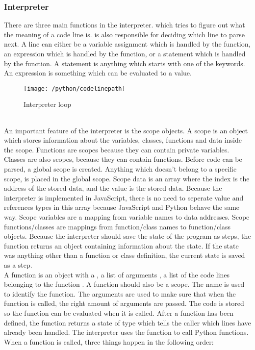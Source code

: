 \subsubsection{Interpreter}
There are three main functions in the interpreter.  which tries to figure out what the meaning of a code line is.  is also responsible for deciding which line to parse next. A line can either be a variable assignment which is handled  by the  function, an expression which is handled by the  function, or a statement which is handled by the  function. A statement is anything which starts with one of the keywords. An expression is something which can be evaluated to a value.
\begin{figure}[h]
    \centering
    \texttt{[image: /python/codelinepath]}
    \caption{Interpreter loop}
    \label{fig:pythonCodeLinePath}
\end{figure}
\\[11pt]
An important feature of the interpreter is the scope objects. A scope is an object which stores information about the variables, classes, functions and data inside the scope. Functions are scopes because they can contain private variables. Classes are also scopes, because they can contain functions. Before code can be parsed, a global scope is created. Anything which doesn't belong to a specific scope, is placed in the global scope. Scope data is an array where the index is the address of the stored data, and the value is the stored data. Because the interpreter is implemented in JavaScript, there is no need to seperate value and references types in this array because JavaScript and Python behave the same way. Scope variables are a mapping from variable names to data addresses. Scope functions/classes are mappings from function/class names to function/class objects. Because the interpreter should save the state of the program as steps, the  function returns an object containing information about the state. If the state was anything other than a function or class definition, the current state is saved as a step.
\\[11pt]
A function is an object with a , a list of arguments , a list of the code lines belonging to the function . A function should also be a scope. The name is used to identify the function. The arguments are used to make sure that when the function is called, the right amount of arguments are passed. The code is stored so the function can be evaluated when it is called. After a function has been defined, the  function returns a state of type  which tells the caller which lines have already been handled. The interpreter uses the  function to call Python functions. When a function is called, three things happen in the following order:
